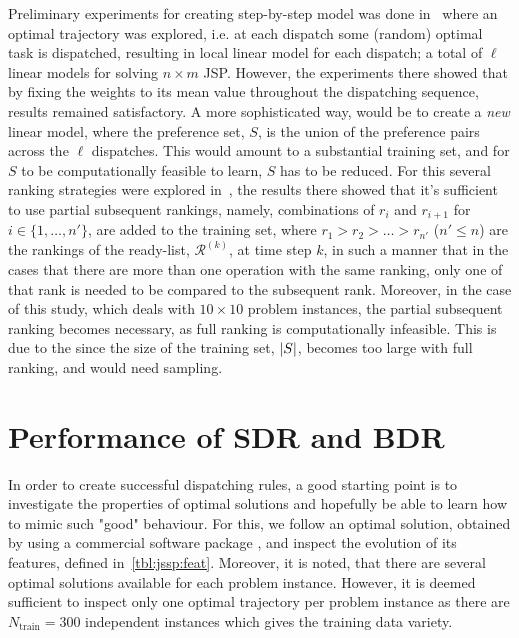 \documentclass[smallextended]{svjour3}
\begin{document}
Preliminary experiments for creating step-by-step model was done in~\cite{InRu11a} where an optimal trajectory was explored, i.e. at each dispatch some (random) optimal task is dispatched, resulting in local linear model for each dispatch; a total of $\ell$ linear models for solving $n\times m$ JSP. However, the experiments there showed that by fixing the weights to its mean value throughout the dispatching sequence, results remained satisfactory.  
A more sophisticated way, would be to create a \emph{new} linear model, where the preference set, $S$, is the union of the preference pairs across the $\ell$ dispatches. This would amount to a substantial training set, and for $S$ to be computationally feasible to learn, $S$ has to be reduced. For this several ranking strategies were explored in~\cite{InRu14b}, the results there showed that it's sufficient to use partial subsequent rankings, namely, combinations of $r_i$ and $r_{i+1}$ for $i\in\{1,\ldots,n'\}$, are added to the training set, where $r_1>r_2>\ldots>r_{n'}$ ($n'\leq n$) are the rankings of the ready-list, $\mathcal{R}^{(k)}$, at time step $k$, in such a manner that in the cases that there are more than one operation with the same ranking, only one of that rank is needed to be compared to the subsequent rank. Moreover, in the case of this study, which deals with $10\times 10$ problem instances, the partial subsequent ranking becomes necessary, as full ranking is computationally infeasible. This is due to the since the size of the training set, $\lvert S\rvert$, becomes too large with full ranking, and would need sampling.

\section{Performance of SDR and BDR}\label{sec:opt}
In order to create successful dispatching rules, a good starting point is to investigate the properties of optimal solutions and hopefully be able to learn how to mimic such "good" behaviour. For this, we follow an optimal solution, obtained by using a commercial software package \cite{gurobi}, and inspect the evolution of its features, defined in~\cref{tbl:jssp:feat}. Moreover, it is noted, that there are several optimal solutions available for each problem instance. However, it is deemed sufficient to inspect only one optimal trajectory per problem instance as there are $N_{\text{train}}=300$ independent instances which gives the training data variety. 
\end{document}
